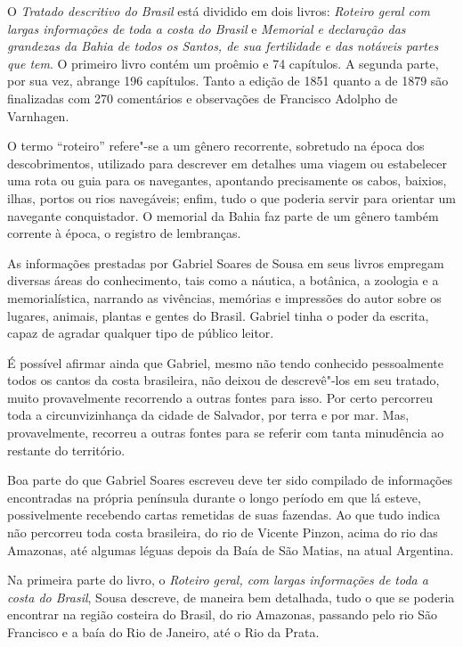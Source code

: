\documentclass[12pt]{extarticle}
\begin{document}
{O \textit{Tratado descritivo do Brasil} está dividido em dois livros: 
\textit{Roteiro geral com largas informações de toda a costa do Brasil} e \textit{Memorial e declaração das grandezas da Bahia de todos os Santos, de sua fertilidade e das notáveis partes que tem}. O primeiro livro contém um proêmio e 74 capítulos. A segunda parte, por sua vez, abrange 196 capítulos. Tanto a edição de 1851 quanto a de 1879 são finalizadas com 270 comentários e observações de Francisco Adolpho de Varnhagen.

O termo ``roteiro'' refere"-se a um gênero recorrente, sobretudo na época dos descobrimentos, utilizado para descrever em detalhes uma viagem ou estabelecer uma rota ou guia para os navegantes, apontando precisamente os cabos, baixios, ilhas, portos ou rios navegáveis; enfim, tudo o que poderia servir para orientar um navegante conquistador. O memorial da Bahia faz parte de um gênero também corrente à época, o registro de lembranças.

As informações prestadas por Gabriel Soares de Sousa em seus livros empregam diversas áreas do conhecimento, tais como a náutica, a botânica, a zoologia e a memorialística, narrando as vivências, memórias e impressões do autor sobre os lugares, animais, plantas e gentes do Brasil. Gabriel tinha o poder da escrita, capaz de agradar qualquer tipo de público leitor.

É possível afirmar ainda que Gabriel, mesmo não tendo conhecido pessoalmente todos os cantos da costa brasileira, não deixou de descrevê"-los em seu tratado, muito provavelmente recorrendo a outras fontes para isso. Por certo percorreu toda a circunvizinhança da cidade de Salvador, por terra e por mar. Mas, provavelmente, recorreu a outras fontes para se referir com tanta minudência ao restante do território.

Boa parte do que Gabriel Soares escreveu deve ter sido compilado de informações encontradas na própria península durante o longo período em que lá esteve, possivelmente recebendo cartas remetidas de suas fazendas. Ao que tudo indica não percorreu toda costa brasileira, do rio de Vicente Pinzon, acima do rio das Amazonas, até algumas léguas depois da Baía de São Matias, na atual Argentina. 

Na primeira parte do livro, o \emph{Roteiro geral, com largas informações de toda a costa do Brasil}, Sousa descreve, de maneira bem detalhada, tudo o que se poderia encontrar na região costeira do Brasil, do rio Amazonas, passando pelo rio São Francisco e a baía do Rio de Janeiro, até o Rio da Prata.

}
\end{document}
